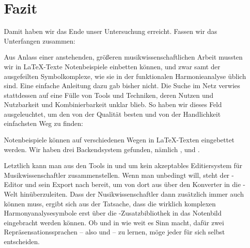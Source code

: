 %
%
%




\chapter{Fazit}

Damit haben wir das Ende unser Untersuchung erreicht. Fassen wir das Unterfangen
zusammen:

Aus Anlass einer anstehenden, größeren musikwissenschaftlichen Arbeit mussten
wir in \LaTeX-Texte Notenbeispiele einbetten können, und zwar samt der
ausgefeilten Symbolkomplexe, wie sie in der funktionalen Harmonieanalyse üblich
sind. Eine einfache Anleitung dazu gab bisher nicht. Die Suche im Netz verwies
stattdessen auf eine Fülle von Tools und Techniken, deren Nutzen und Nutzbarkeit
und Kombinierbarkeit unklar blieb. So haben wir dieses Feld ausgeleuchtet, um
den von der Qualität besten und von der Handlichkeit einfachsten Weg zu finden:

Notenbeispiele können auf verschiedenen Wegen in \LaTeX-Texten eingebettet
werden. Wir haben drei Backendsystem gefunden, nämlich
,  und
.

Letztlich kann man aus den Tools in und um  kein akzeptables
Editiersystem für Musikwissenschaftler zusammenstellen. Wenn man unbedingt will,
steht der -Editor und sein Export nach  bereit, um
von dort aus über den Konverter  in die -Welt
hinüberzuleiten. Dass der Nusikwissenschaftler dann zusätzlich immer auch
 können muss, ergibt sich aus der Tatsache, dass die wirklich
komplexen Harmonyanalysesymbole erst über die -Zusatzbibliothek
 in das Notenbild eingebracht werden können. Ob und in wie
weit es Sinn macht, dafür zwei Repräsensationssprachen -- also  und
 -- zu lernen, möge jeder für sich selbst entscheiden.


